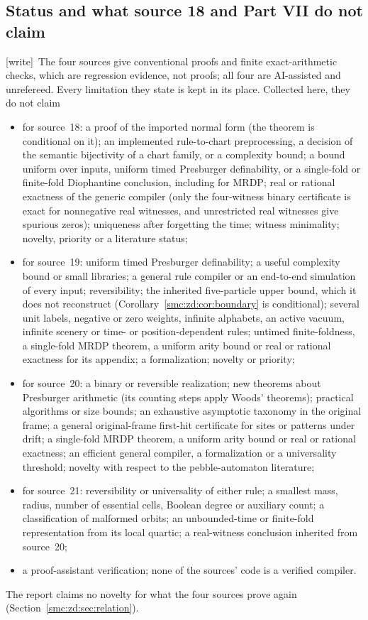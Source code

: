 \documentclass[11pt,letterpaper]{article}
\numberwithin{equation}{section}
\theoremstyle{definition}
\theoremstyle{remark}
\newcommand{\wtag}{\textup{[write]}}
\begin{document}
\subsection{Status and what source 18 and Part VII do not claim}\label{smc:zd:sec:status}

\wtag\ The four sources give conventional proofs and finite exact-arithmetic checks, which are regression evidence, not proofs; all four are AI-assisted and unrefereed. Every limitation they state is kept in its place. Collected here, they do not claim
\begin{itemize}
\item for source~18: a proof of the imported normal form (the theorem is conditional on it); an implemented rule-to-chart preprocessing, a decision of the semantic bijectivity of a chart family, or a complexity bound; a bound uniform over inputs, uniform timed Presburger definability, or a single-fold or finite-fold Diophantine conclusion, including for MRDP; real or rational exactness of the generic compiler (only the four-witness binary certificate is exact for nonnegative real witnesses, and unrestricted real witnesses give spurious zeros); uniqueness after forgetting the time; witness minimality; novelty, priority or a literature status;
\item for source~19: uniform timed Presburger definability; a useful complexity bound or small libraries; a general rule compiler or an end-to-end simulation of every input; reversibility; the inherited five-particle upper bound, which it does not reconstruct (Corollary~\ref{smc:zd:cor:boundary} is conditional); several unit labels, negative or zero weights, infinite alphabets, an active vacuum, infinite scenery or time- or position-dependent rules; untimed finite-foldness, a single-fold MRDP theorem, a uniform arity bound or real or rational exactness for its appendix; a formalization; novelty or priority;
\item for source~20: a binary or reversible realization; new theorems about Presburger arithmetic (its counting steps apply Woods' theorems); practical algorithms or size bounds; an exhaustive asymptotic taxonomy in the original frame; a general original-frame first-hit certificate for sites or patterns under drift; a single-fold MRDP theorem, a uniform arity bound or real or rational exactness; an efficient general compiler, a formalization or a universality threshold; novelty with respect to the pebble-automaton literature;
\item for source~21: reversibility or universality of either rule; a smallest mass, radius, number of essential cells, Boolean degree or auxiliary count; a classification of malformed orbits; an unbounded-time or finite-fold representation from its local quartic; a real-witness conclusion inherited from source~20;
\item a proof-assistant verification; none of the sources' code is a verified compiler.
\end{itemize}
The report claims no novelty for what the four sources prove again (Section~\ref{smc:zd:sec:relation}).
\end{document}
